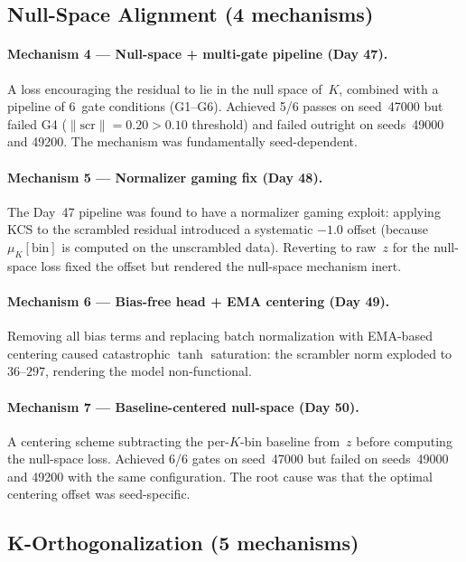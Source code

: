 \subsection{Null-Space Alignment (4 mechanisms)}

\paragraph{Mechanism 4 --- Null-space + multi-gate pipeline (Day 47).} A loss encouraging the residual to lie in the null space of~$K$, combined with a pipeline of 6~gate conditions (G1--G6). Achieved 5/6 passes on seed~47000 but failed G4 ($\|\mathrm{scr}\| = 0.20 > 0.10$ threshold) and failed outright on seeds~49000 and 49200. The mechanism was fundamentally seed-dependent.

\paragraph{Mechanism 5 --- Normalizer gaming fix (Day 48).} The Day~47 pipeline was found to have a normalizer gaming exploit: applying KCS to the scrambled residual introduced a systematic $-1.0$ offset (because $\mu_K[\text{bin}]$ is computed on the unscrambled data). Reverting to raw~$z$ for the null-space loss fixed the offset but rendered the null-space mechanism inert.

\paragraph{Mechanism 6 --- Bias-free head + EMA centering (Day 49).} Removing all bias terms and replacing batch normalization with EMA-based centering caused catastrophic $\tanh$ saturation: the scrambler norm exploded to $36$--$297$, rendering the model non-functional.

\paragraph{Mechanism 7 --- Baseline-centered null-space (Day 50).} A centering scheme subtracting the per-$K$-bin baseline from~$z$ before computing the null-space loss. Achieved 6/6 gates on seed~47000 but failed on seeds~49000 and 49200 with the same configuration. The root cause was that the optimal centering offset was seed-specific.

\subsection{K-Orthogonalization (5 mechanisms)}

